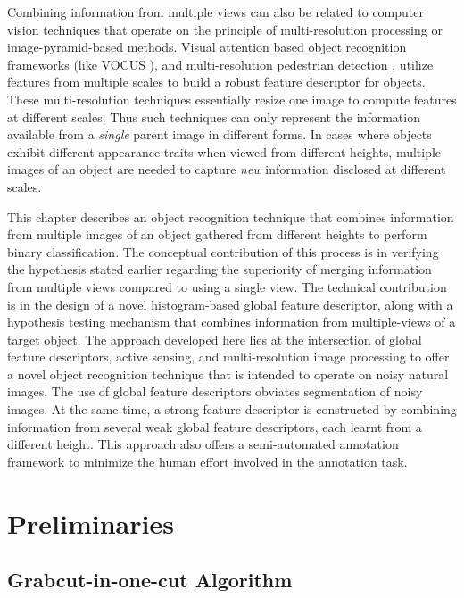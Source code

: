 Combining information from multiple views can also be related to computer vision techniques that operate on the principle of multi-resolution processing or image-pyramid-based methods. Visual attention based object recognition frameworks (like VOCUS \cite{frintrop}), and multi-resolution pedestrian detection \cite{park}, utilize features from multiple scales to build a robust feature descriptor for objects. These multi-resolution techniques essentially resize one image to compute features at different scales. Thus such techniques can only represent the information available from a \emph{single} parent image in different forms. In cases where objects exhibit different appearance traits when viewed from different heights, multiple images of an object are needed to capture \emph{new} information disclosed at different scales.

This chapter describes an object recognition technique that combines information from multiple images of an object gathered from different heights to perform binary classification. The conceptual contribution of this process is in verifying the hypothesis stated earlier regarding the superiority of merging information from multiple views compared to using a single view. The technical contribution is in the design of a novel histogram-based global feature descriptor, along with a hypothesis testing mechanism that combines information from multiple-views of a target object. The approach developed here lies at the intersection of global feature descriptors, active sensing, and multi-resolution image processing to offer a novel object recognition technique that is intended to operate on noisy natural images. The use of global feature descriptors obviates segmentation of noisy images. At the same time, a strong feature descriptor is constructed by combining information from several weak global feature descriptors, each learnt from a different height. This approach also offers a semi-automated annotation framework to minimize the human effort involved in the annotation task.

\section{Preliminaries}

\subsection{Grabcut-in-one-cut Algorithm}
\label{sec:onecut}

